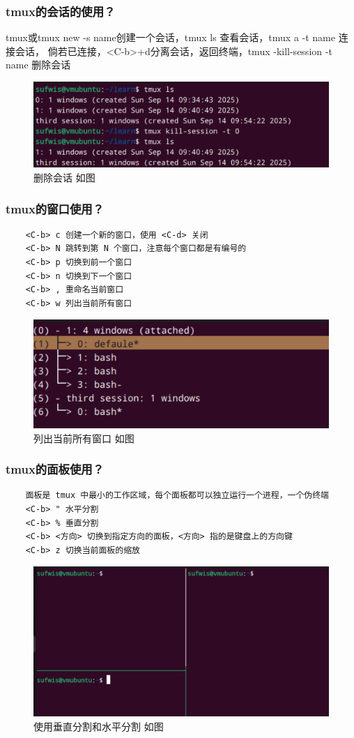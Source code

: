 \documentclass[UTF8]{ctexart}
\begin{document}
\subsubsection{tmux的会话的使用？}
tmux或tmux new -s name创建一个会话，tmux ls 查看会话，tmux a -t name 连接会话，
倘若已连接，<C-b>+d分离会话，返回终端，tmux -kill-session -t name 删除会话
\begin{figure}[H]
	\centering
	\includegraphics[width=0.7\linewidth]{figure/tmux_session.png}
	\caption{删除会话 如图}
\end{figure}

\subsubsection{tmux的窗口使用？}
\begin{verbatim}
	<C-b> c 创建一个新的窗口，使用 <C-d> 关闭
	<C-b> N 跳转到第 N 个窗口，注意每个窗口都是有编号的
	<C-b> p 切换到前一个窗口
	<C-b> n 切换到下一个窗口
	<C-b> , 重命名当前窗口
	<C-b> w 列出当前所有窗口
\end{verbatim}
\begin{figure}[H]
	\centering
	\includegraphics[width=0.7\linewidth]{figure/tmux_windows.png}
	\caption{列出当前所有窗口 如图}
\end{figure}

\subsubsection{tmux的面板使用？}
\begin{verbatim}
	面板是 tmux 中最小的工作区域，每个面板都可以独立运行一个进程，一个伪终端
	<C-b> " 水平分割
	<C-b> % 垂直分割
	<C-b> <方向> 切换到指定方向的面板，<方向> 指的是键盘上的方向键
	<C-b> z 切换当前面板的缩放
\end{verbatim}
\begin{figure}[H]
	\centering
	\includegraphics[width=0.7\linewidth]{figure/tmux_panel.png}
	\caption{使用垂直分割和水平分割 如图}
\end{figure}
\end{document}

